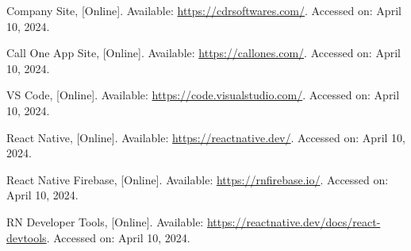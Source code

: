 \begin{thebibliography}{1}

    
    
    
    
    

    Company Site, [Online].
    Available: \url{https://cdrsoftwares.com/}.
    Accessed on: April 10, 2024.

    Call One App Site, [Online].
    Available: \url{https://callones.com/}.
    Accessed on: April 10, 2024.
    
    VS Code, [Online].
    Available: \url{https://code.visualstudio.com/}.
    Accessed on: April 10, 2024.

    React Native, [Online].
    Available: \url{https://reactnative.dev/}.
    Accessed on: April 10, 2024.

    React Native Firebase, [Online].
    Available: \url{https://rnfirebase.io/}.
    Accessed on: April 10, 2024.

    RN Developer Tools, [Online].
    Available: \url{https://reactnative.dev/docs/react-devtools}.
    Accessed on: April 10, 2024.


\end{thebibliography}

